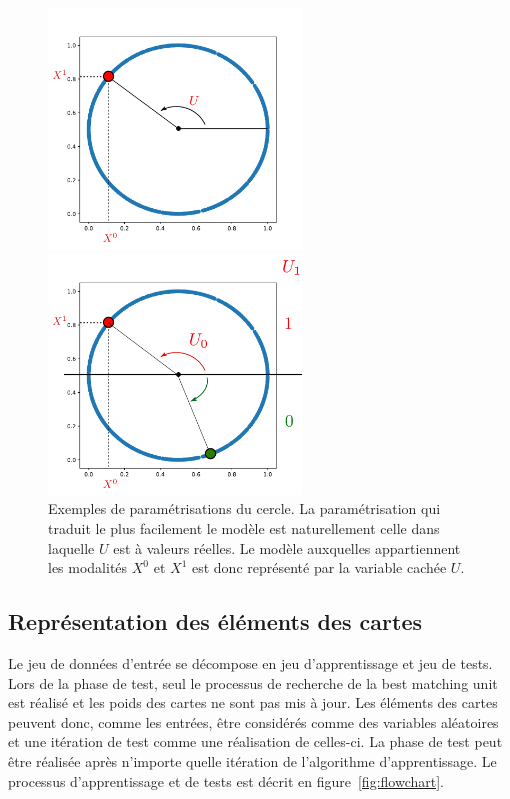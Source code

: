 \begin{figure}
\begin{minipage}{0.5\textwidth}
\centering
\includegraphics[width=0.6\textwidth]{cercle.pdf}
\end{minipage}
\begin{minipage}{0.5\textwidth}
\centering
\includegraphics[width=0.6\textwidth]{cercle_2.pdf}
\end{minipage}
\label{fig:U}
\caption{Exemples de paramétrisations du cercle. La paramétrisation qui traduit le plus facilement le modèle est naturellement celle dans laquelle $U$ est à valeurs réelles. Le modèle auxquelles appartiennent les modalités $X^0$ et $X^1$ est donc représenté par la variable cachée $U$.}
\end{figure}


\subsection{Représentation des éléments des cartes}

Le jeu de données d'entrée se décompose en jeu d'apprentissage et jeu de tests. Lors de la phase de test, seul le processus de recherche de la best matching unit est réalisé et les poids des cartes ne sont pas mis à jour. Les éléments des cartes peuvent donc, comme les entrées, être considérés comme des variables aléatoires et une itération de test comme une réalisation de celles-ci. La phase de test peut être réalisée après n'importe quelle itération de l'algorithme d'apprentissage. Le processus d'apprentissage et de tests est décrit en figure~\ref{fig:flowchart}.

